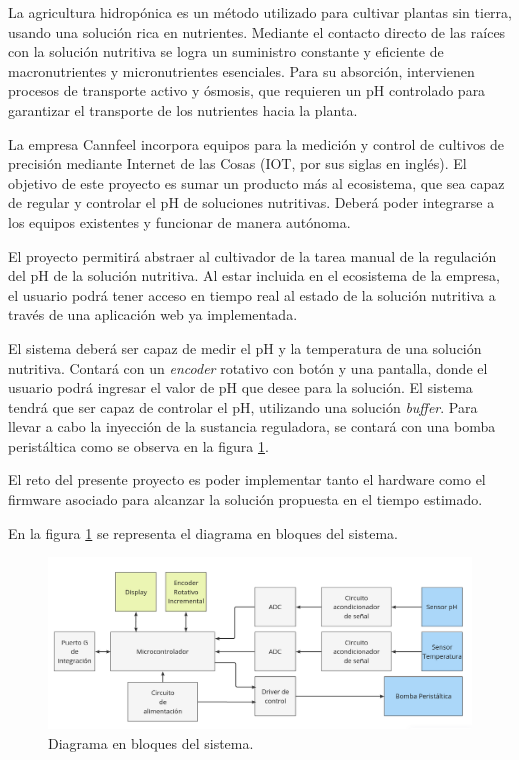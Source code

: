 \documentclass[
11pt, %
codirector, %
]{charter}
\begin{document}
La agricultura hidropónica es un método utilizado para cultivar plantas sin tierra, usando una solución rica en nutrientes. Mediante el contacto directo de las raíces con la solución nutritiva se logra un suministro constante y eficiente de macronutrientes y micronutrientes esenciales. Para su absorción, intervienen procesos de transporte activo y ósmosis, que requieren un pH controlado para garantizar el transporte de los nutrientes hacia la planta.

La empresa Cannfeel incorpora equipos para la medición y control de cultivos de precisión mediante Internet de las Cosas (IOT, por sus siglas en inglés). El objetivo de este proyecto es sumar un producto más al ecosistema, que sea capaz de regular y controlar el pH de soluciones nutritivas. Deberá poder integrarse a los equipos existentes y funcionar de manera autónoma.

El proyecto permitirá abstraer al cultivador de la tarea manual de la regulación del pH de la solución nutritiva. Al estar incluida en el ecosistema de la empresa, el usuario podrá tener acceso en tiempo real al estado de la solución nutritiva a través de una aplicación web ya implementada.

El sistema deberá ser capaz de medir el pH y la temperatura de una solución nutritiva. Contará con un \textit{encoder} rotativo con botón y una pantalla, donde el usuario podrá ingresar el valor de pH que desee para la solución. El sistema tendrá que ser capaz de controlar el pH, utilizando una solución \textit{buffer}. Para llevar a cabo la inyección de la sustancia reguladora, se contará con una bomba peristáltica como se observa en la figura \ref{fig:diagBloq}.

El reto del presente proyecto es poder implementar tanto el hardware como el firmware asociado para alcanzar la solución propuesta en el tiempo estimado.

En la figura \ref{fig:diagBloq} se representa el diagrama en bloques del sistema.

\begin{figure}[htpb]
\centering 
\includegraphics[width=.85\textwidth]{./Figuras/diagBloq.png}
\caption{Diagrama en bloques del sistema.}
\label{fig:diagBloq}
\end{figure}
\end{document}
